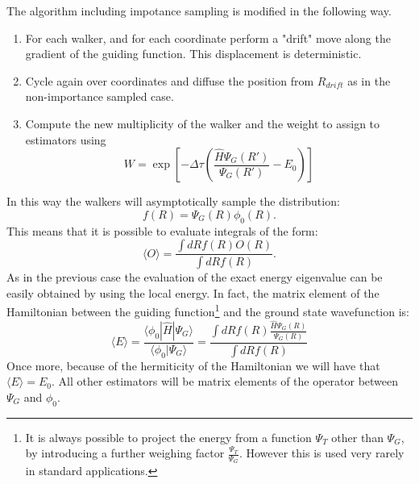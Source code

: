 The algorithm including impotance sampling is modified in the following way.
\begin{enumerate}
\item
   For each walker, and for each coordinate perform a "drift" move along the
   gradient of the guiding function. This displacement is deterministic.
 	\begin{algorithmic} 
 		\EndFor
 		\EndFor
 	\end{algorithmic}
\item
Cycle again over coordinates and diffuse the position from $R_{drift}$ as in the non-importance sampled case.
\item
Compute the new multiplicity of the walker and the weight to assign to estimators using
\begin{equation}
W=\exp\left[-\Delta\tau\left(\frac{\hat{H}\Psi_G(R')}{\Psi_G(R')}-E_0\right)\right]
\end{equation}
\end{enumerate}
In this way the walkers will asymptotically sample the distribution:
\begin{equation}
f(R)=\Psi_G(R)\phi_0(R).
\end{equation}
This means that it is possible to evaluate integrals of the form:
\begin{equation}
\langle O\rangle=\frac{\int dR f(R) O(R)}{\int dR f(R)}.
\end{equation}
As in the previous case the evaluation of the exact energy eigenvalue can be easily obtained by using the local energy. In fact, the matrix element of the Hamiltonian between the guiding function\footnote{It is always possible to project the energy from a function $\Psi_T$ other than $\Psi_G$, by introducing a further weighing factor $\frac{\Psi_T}{\Psi_G}$. However this is used very rarely in standard applications.}  and the ground state wavefunction is:  
\begin{equation}
\langle E\rangle =\frac{\langle \phi_0|\hat{H}|\Psi_G\rangle}{\langle \phi_0|\Psi_G\rangle}=\frac{\int dR f(R)\frac{\hat{H}\Psi_G(R)}{\Psi_G(R)}}{\int dR f(R)}
\end{equation}
Once more, because of the hermiticity of the Hamiltonian we will have that $\langle E\rangle =E_0$. All other estimators will be matrix elements of the operator between $\Psi_G$ and $\phi_0$. 

